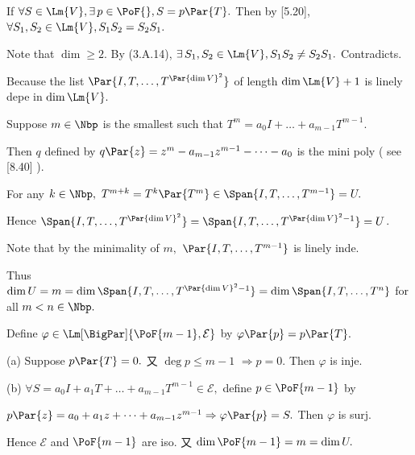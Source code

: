 If $\forall S\in\Lm{V},\exists\,p\in\PoF{},S=p\Par{T}.$ Then by [5.20], $\forall S_1,S_2\in\Lm{V},S_1S_2=S_2S_1.$\par
\Blind{\Solution} Note that $\dim\geqslant 2.$ By (3.A.14), $\exists\,S_1,S_2\in\Lm{V},S_1S_2\neq S_2S_1.$ Contradicts.\PfEnd
\SepLine

\par\quad
Because the list $\Par{I,T,\dots,T^{\Par{\dim V}^2}}$ of length $\dim\Lm{V}+1$ is linely depe in $\dim\Lm{V}.$\par\quad
Suppose $m\in\Nbp$ is the smallest such that $T^m=a_0 I+\dots+a_{m-1}T^{m-1}.$\par\quad
Then $q$ defined by $q\Par{z}=z^m-a_{m-1}z^{m-1}-\dots-a_0$ is the mini poly ( see [8.40] ).\par\quad
For any $k\in\Nbp,\,\,T^{m+k}=T^k\Par{T^m}\in\Span{I,T,\dots,T^{m-1}}=U.$\par\quad
Hence $\Span{I,T,\dots,T^{\Par{\dim V}^2}}=\Span{I,T,\dots,T^{\Par{\dim V}^2-1}}=U$.\par\quad
Note that by the minimality of $m,$ $\Par{I,T,\dots,T^{m-1}}$ is linely inde.\par\quad
Thus $\dim U=m=\dim\Span{I,T,\dots,T^{\Par{\dim V}^2-1}}=\dim\Span{I,T,\dots,T^n}$ for all $m<n\in\Nbp.$\par\vspace{6pt}\quad
Define $\varphi\in\Lm[\BigPar]{\PoF{m-1},\mathcal{E}}$ by $\varphi\Par{p}=p\Par{T}.$\par\quad
(a) Suppose $p\Par{T}=0.$ 又 $\deg p\leqslant m-1$ $\Rightarrow p=0.$ Then $\varphi$ is inje.\par\quad
(b) $\forall S=a_0 I+a_1 T+\dots+a_{m-1}T^{m-1}\in\mathcal{E},$ define $p\in\PoF{m-1}$ by\par\quad\Hb
$p\Par{z}=a_0+a_1 z+\dots+a_{m-1}z^{m-1}\Rightarrow\varphi\Par{p}=S.$ Then $\varphi$ is surj.\par\quad
Hence $\mathcal{E}$ and $\PoF{m-1}$ are iso. 又 $\dim\PoF{m-1}=m=\dim U.
$\PfEnd
\SepLine

